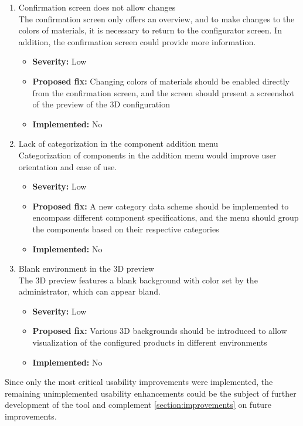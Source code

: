 \begin{enumerate}[label=\textbf{I\arabic*:}, leftmargin=*]
    \item Confirmation screen does not allow changes
        \vspace{2pt}
        \\The confirmation screen only offers an overview, and to make changes to the colors of materials, it is necessary to return to the configurator screen. In addition, the confirmation screen could provide more information.
        \begin{itemize}[noitemsep, label=\trianglebullet]
            \item \textbf{Severity:} Low
            \item \textbf{Proposed fix:} Changing colors of materials should be enabled directly from the confirmation screen, and the screen should present a screenshot of the preview of the 3D configuration
            \item \textbf{Implemented:} No
        \end{itemize}
        \vspace{4pt}

    \item Lack of categorization in the component addition menu
        \vspace{2pt}
        \\Categorization of components in the addition menu would improve user orientation and ease of use.
        \begin{itemize}[noitemsep, label=\trianglebullet]
            \item \textbf{Severity:} Low
            \item \textbf{Proposed fix:} A new category data scheme should be implemented to encompass different component specifications, and the menu should group the components based on their respective categories
            \item \textbf{Implemented:} No
        \end{itemize}
        \vspace{4pt}

    \item Blank environment in the 3D preview
        \vspace{2pt}
        \\The 3D preview features a blank background with color set by the administrator, which can appear bland.
        \begin{itemize}[noitemsep, label=\trianglebullet]
            \item \textbf{Severity:} Low
            \item \textbf{Proposed fix:} Various 3D backgrounds should be introduced to allow visualization of the configured products in different environments
            \item \textbf{Implemented:} No
        \end{itemize}
        \vspace{4pt}
\end{enumerate}

Since only the most critical usability improvements were implemented, the remaining unimplemented usability enhancements could be the subject of further development of the tool and complement \autoref{section:improvements} on future improvements.
